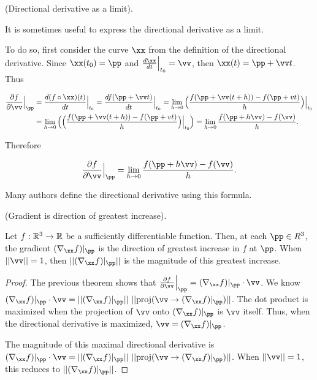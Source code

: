 \begin{theorem}
\label{ch::calc::thm::directional_deriv_as_limit}
    (Directional derivative as a limit).
    
    It is sometimes useful to express the directional derivative as a limit. 
    
    To do so, first consider the curve $\xx$ from the definition of the directional derivative. Since $\xx(t_0) = \pp$ and $\frac{d \xx}{dt}\Big|_{t_0} = \vv$, then $\xx(t) = \pp + \vv t$. Thus
    
    \begin{align*}
        \frac{\pd f}{\pd \vv}\Big|_\pp 
        &= \frac{d (f \circ \xx)(t)}{dt}\Big|_{t_0}
        = \frac{d f(\pp + \vv t)}{dt}\Big|_{t_0}
        = \lim_{h \rightarrow 0} \Big( \frac{f(\pp + \vv(t + h)) - f(\pp + vt)}{h} \Big) \Big|_{t_0} \\
        &= \lim_{h \rightarrow 0} \Big( \Big( \frac{f(\pp + \vv(t + h)) - f(\pp + vt)}{h} \Big) \Big|_{t_0} \Big)
        = \lim_{h \rightarrow 0} \frac{f(\pp + h\vv) - f(\vv)}{h}.
    \end{align*}
    
    Therefore
    
    \begin{align*}
        \frac{\pd f}{\pd \vv}\Big|_\pp = \lim_{h \rightarrow 0} \frac{f(\pp + h\vv) - f(\vv)}{h}.
    \end{align*}
    
    Many authors define the directional derivative using this formula.
\end{theorem}

\begin{theorem}
    (Gradient is direction of greatest increase).
    
    Let $f:\mathbb{R}^3 \rightarrow \mathbb{R}$ be a sufficiently differentiable function. Then, at each $\pp \in R^3$, the gradient $(\nabla_\xx f)|_\pp$ is the direction of greatest increase in $f$ at $\pp$. When $||\vv|| = 1$, then $||(\nabla_\xx f)|_\pp||$ is the magnitude of this greatest increase.
\end{theorem}

\begin{proof}
    The previous theorem shows that $\frac{\pd f}{\pd \vv}\Big|_\pp = (\nabla_\xx f)|_\pp \cdot \vv$. We know \\ ${(\nabla_\xx f)|_\pp \cdot \vv = ||(\nabla_\xx f)|_\pp|| \spc ||\proj(\vv \rightarrow (\nabla_\xx f)|_\pp)||}$. The dot product is maximized when the projection of $\vv$ onto $(\nabla_\xx f)|_\pp$ is $\vv$ itself. Thus, when the directional derivative is maximized, $\vv = (\nabla_\xx f)|_\pp$.
    
    The magnitude of this maximal directional derivative is ${(\nabla_\xx f)|_\pp \cdot \vv = ||(\nabla_\xx f)|_\pp|| \spc ||\proj(\vv \rightarrow (\nabla_\xx f)|_\pp)||}$. When $||\vv|| = 1$, this reduces to $||(\nabla_\xx f)|_\pp||$.
\end{proof}

